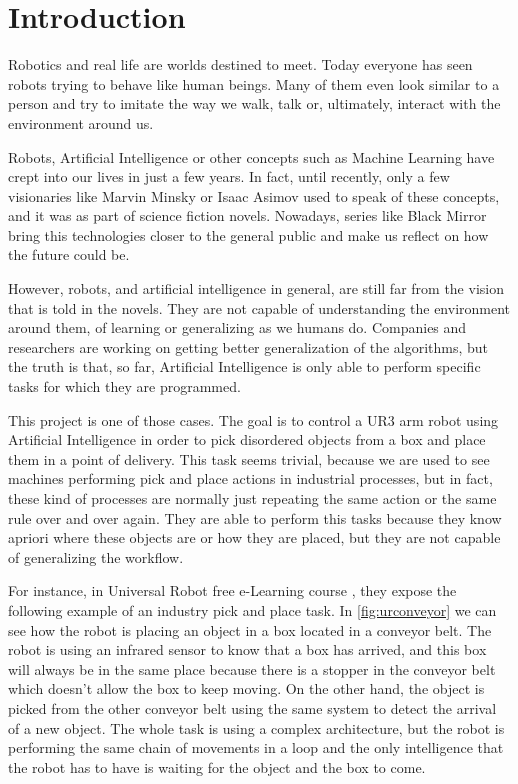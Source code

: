 \chapter{Introduction}

Robotics and real life are worlds destined to meet. Today everyone has seen robots trying to behave like human beings. Many of them even look similar to a person and try to imitate the way we walk, talk or, ultimately, interact with the environment around us. 

Robots, Artificial Intelligence or other concepts such as Machine Learning have crept into our lives in just a few years. In fact, until recently, only a few visionaries like Marvin Minsky or Isaac Asimov used to speak of these concepts, and it was as part of science fiction novels. Nowadays, series like Black Mirror bring this technologies closer to the general public and make us reflect on how the future could be.

However, robots, and artificial intelligence in general, are still far from the vision that is told in the novels. They are not capable of understanding the environment around them, of learning or generalizing as we humans do. Companies and researchers are working on getting better generalization of the algorithms, but the truth is that, so far, Artificial Intelligence is only able to perform specific tasks for which they are programmed.

This project is one of those cases. The goal is to control a UR3 arm robot using Artificial Intelligence in order to pick disordered objects from a box and place them in a point of delivery. This task seems trivial, because we are used to see machines performing pick and place actions in industrial processes, but in fact, these kind of processes are normally just repeating the same action or the same rule over and over again. They are able to perform this tasks because they know apriori where these objects are or how they are placed, but they are not capable of generalizing the workflow. 

For instance, in Universal Robot free e-Learning course \cite{noauthor_formacion_nodate}, they expose the following example of an industry pick and place task. In
\autoref{fig:urconveyor} we can see how the robot is placing an object in a box located in a conveyor belt. The robot is using an infrared sensor to know that a box has arrived, and this box will always be in the same place because there is a stopper in the conveyor belt which doesn't allow the box to keep moving. On the other hand, the object is picked from the other conveyor belt using the same system to detect the arrival of a new object. The whole task is using a complex architecture, but the robot is performing the same chain of movements in a loop and the only intelligence that the robot has to have is waiting for the object and the box to come.

